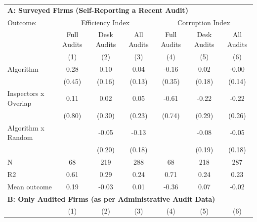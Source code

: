 \begin{tabular}{lccc|ccc} \toprule
\multicolumn{7}{l}{\textbf{A: Surveyed Firms (Self-Reporting a Recent Audit)}} \\ \multicolumn{1}{l}{Outcome:} & \multicolumn{3}{c}{Efficiency Index} & \multicolumn{3}{c}{Corruption Index} \\ \multicolumn{1}{l}{} & Full Audits & Desk Audits & All Audits & Full Audits & Desk Audits & All Audits \\ \multicolumn{1}{l}{} & (1) & (2) & (3) & (4) & (5) & (6) \\ \midrule
Algorithm   &        0.28         &        0.10         &        0.04         &       -0.16         &        0.02         &       -0.00         \\
            &      (0.45)         &      (0.16)         &      (0.13)         &      (0.35)         &      (0.18)         &      (0.14)         \\
\addlinespace
Inspectors x Overlap&        0.11         &        0.02         &        0.05         &       -0.61         &       -0.22         &       -0.22         \\
            &      (0.80)         &      (0.30)         &      (0.23)         &      (0.74)         &      (0.29)         &      (0.26)         \\
\addlinespace
Algorithm x Random&                     &       -0.05         &       -0.13         &                     &       -0.08         &       -0.05         \\
            &                     &      (0.20)         &      (0.18)         &                     &      (0.19)         &      (0.18)         \\
\midrule
N           &          68         &         219         &         288         &          68         &         218         &         287         \\
R2          &        0.61         &        0.29         &        0.24         &        0.71         &        0.24         &        0.23         \\
Mean outcome&        0.19         &       -0.03         &        0.01         &       -0.36         &        0.07         &       -0.02         \\

\midrule \multicolumn{7}{l}{\textbf{B: Only Audited Firms (as per Administrative Audit Data)}} \\ \multicolumn{1}{l}{} & (1) & (2) & (3) & (4) & (5) & (6) \\ \midrule


\end{tabular}
